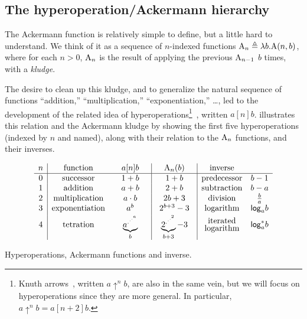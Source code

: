 \subsection{The hyperoperation/Ackermann hierarchy}

The Ackermann function is relatively simple to define, but a little hard to
understand.  We think of it as
a sequence of $n$-indexed functions $\text{A}_n \triangleq \lambda b.\text{A}(n,b)$, where for each $n>0$, $\text{A}_n$ is the result of applying the previous $\text{A}_{n-1}$ $b$ times, with a \emph{kludge}.

The desire to clean up this kludge, and to generalize the natural sequence
of functions ``addition,'' ``multiplication,'' ``exponentiation,'' \ldots,
led to the development of the related idea of hyperoperations\footnote{Knuth arrows~\cite{knuth}, written $a \uparrow^n b$,
are also in the same vein, but we will focus on hyperoperations
since they are more general. In particular, $a \uparrow^n b = a[n+2]b$.}~\cite{goodstein},
written $a [n] b$.
 illustrates this relation and the Ackermann kludge
by showing the first five hyperoperations (indexed by $n$ and named),
along with their relation to the $\text{A}_n$ functions, and their inverses.
\begin{table}[t]
\centering
	\[
\begin{array}{c|cc|c|cc}
n & \text{function} & \quad a [n] b \quad & \quad \Ack_n(b) \quad & \text{inverse} \\
\hline
0 & \text{successor} & 1 + b & 1 + b & \text{predecessor} & b - 1 \\
1 & \text{addition} & a + b & 2 + b & \text{subtraction} & b - a \\
2 & \text{multiplication} & a \cdot b & 2b + 3 & \text{division} & \frac{b}{a}\\
3 & \text{exponentiation} & a^b & 2^{b + 3} - 3 & \text{logarithm} & \mathsf{log}_a b \\
[2pt]
4 & \text{tetration} & \underbrace{a^{.^{.^{.^a}}}}_b & \underbrace{2^{.^{.^{.^2}}}}_{b+3} - 3 & \begin{array}{@{}c@{}}\text{iterated}\\[-3pt]\text{logarithm}\end{array} & \mathsf{log}^*_a b
\end{array}
\] \caption{Hyperoperations, Ackermann functions and inverse.}
\label{table: hyperop-ack-inv}
\end{table}

